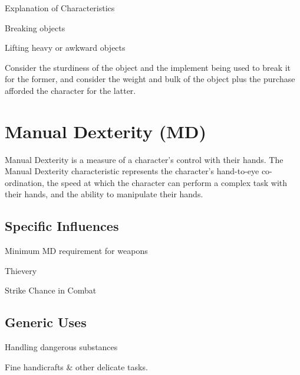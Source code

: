 \begin{Chapter}{Explanation of Characteristics}
\begin{Itemize}

\item Breaking objects

\item Lifting heavy or awkward objects 

\end{Itemize}

\begin{example}
Consider the sturdiness of the object and the implement being used to
break it for the former, and consider the weight and bulk of the
object plus the purchase afforded the character for the latter.
\end{example}


\section{Manual Dexterity (MD)}

Manual Dexterity is a measure of a character’s control with their
hands.  The Manual Dexterity characteristic represents the character’s
hand-to-eye co-ordination, the speed at which the character can
perform a complex task with their hands, and the ability to manipulate
their hands.

\subsection{Specific Influences}

\begin{Itemize}

\item Minimum MD requirement for weapons

\item Thievery  

\item Strike Chance in Combat 

\end{Itemize}

\subsection{Generic Uses}

\begin{Itemize}

\item Handling dangerous substances

\item Fine handicrafts \& other delicate tasks.


\end{Itemize}
\end{Chapter}
